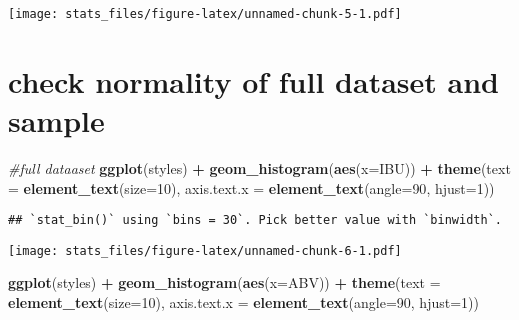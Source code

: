 \documentclass[]{article}
\newenvironment{Shaded}{\begin{snugshade}}{\end{snugshade}}
\newcommand{\KeywordTok}[1]{\textcolor[rgb]{0.13,0.29,0.53}{\textbf{#1}}}
\newcommand{\DataTypeTok}[1]{\textcolor[rgb]{0.13,0.29,0.53}{#1}}
\newcommand{\DecValTok}[1]{\textcolor[rgb]{0.00,0.00,0.81}{#1}}
\newcommand{\StringTok}[1]{\textcolor[rgb]{0.31,0.60,0.02}{#1}}
\newcommand{\CommentTok}[1]{\textcolor[rgb]{0.56,0.35,0.01}{\textit{#1}}}
\newcommand{\OperatorTok}[1]{\textcolor[rgb]{0.81,0.36,0.00}{\textbf{#1}}}
\newcommand{\NormalTok}[1]{#1}
\begin{document}
\texttt{[image: stats\_files/figure-latex/unnamed-chunk-5-1.pdf]}

\begin{Shaded}
\end{Shaded}

\section{check normality of full dataset and
sample}\label{check-normality-of-full-dataset-and-sample}

\begin{Shaded}
\begin{Highlighting}[]
\CommentTok{#full dataaset}
\KeywordTok{ggplot}\NormalTok{(styles) }\OperatorTok{+}
\StringTok{    }\KeywordTok{geom_histogram}\NormalTok{(}\KeywordTok{aes}\NormalTok{(}\DataTypeTok{x=}\NormalTok{IBU)) }\OperatorTok{+}
\StringTok{    }\KeywordTok{theme}\NormalTok{(}\DataTypeTok{text =} \KeywordTok{element_text}\NormalTok{(}\DataTypeTok{size=}\DecValTok{10}\NormalTok{),}
        \DataTypeTok{axis.text.x =} \KeywordTok{element_text}\NormalTok{(}\DataTypeTok{angle=}\DecValTok{90}\NormalTok{, }\DataTypeTok{hjust=}\DecValTok{1}\NormalTok{)) }
\end{Highlighting}
\end{Shaded}

\begin{verbatim}
## `stat_bin()` using `bins = 30`. Pick better value with `binwidth`.
\end{verbatim}

\texttt{[image: stats\_files/figure-latex/unnamed-chunk-6-1.pdf]}

\begin{Shaded}
\begin{Highlighting}[]
\KeywordTok{ggplot}\NormalTok{(styles) }\OperatorTok{+}
\StringTok{    }\KeywordTok{geom_histogram}\NormalTok{(}\KeywordTok{aes}\NormalTok{(}\DataTypeTok{x=}\NormalTok{ABV)) }\OperatorTok{+}
\StringTok{    }\KeywordTok{theme}\NormalTok{(}\DataTypeTok{text =} \KeywordTok{element_text}\NormalTok{(}\DataTypeTok{size=}\DecValTok{10}\NormalTok{),}
        \DataTypeTok{axis.text.x =} \KeywordTok{element_text}\NormalTok{(}\DataTypeTok{angle=}\DecValTok{90}\NormalTok{, }\DataTypeTok{hjust=}\DecValTok{1}\NormalTok{)) }
\end{Highlighting}
\end{Shaded}
\end{document}
